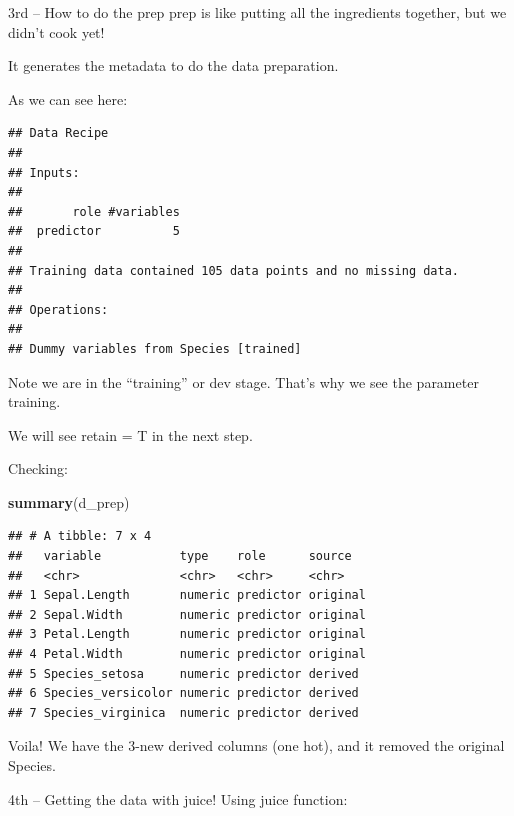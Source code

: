 \documentclass[]{article}
\newenvironment{Shaded}{\begin{snugshade}}{\end{snugshade}}
\newcommand{\KeywordTok}[1]{\textcolor[rgb]{0.13,0.29,0.53}{\textbf{#1}}}
\newcommand{\DataTypeTok}[1]{\textcolor[rgb]{0.13,0.29,0.53}{#1}}
\newcommand{\DecValTok}[1]{\textcolor[rgb]{0.00,0.00,0.81}{#1}}
\newcommand{\StringTok}[1]{\textcolor[rgb]{0.31,0.60,0.02}{#1}}
\newcommand{\OperatorTok}[1]{\textcolor[rgb]{0.81,0.36,0.00}{\textbf{#1}}}
\newcommand{\NormalTok}[1]{#1}
\begin{document}
3rd -- How to do the prep prep is like putting all the ingredients
together, but we didn't cook yet!

It generates the metadata to do the data preparation.

As we can see here:

\begin{Shaded}
\end{Shaded}

\begin{verbatim}
## Data Recipe
## 
## Inputs:
## 
##       role #variables
##  predictor          5
## 
## Training data contained 105 data points and no missing data.
## 
## Operations:
## 
## Dummy variables from Species [trained]
\end{verbatim}

Note we are in the ``training'' or dev stage. That's why we see the
parameter training.

We will see retain = T in the next step.

Checking:

\begin{Shaded}
\begin{Highlighting}[]
\KeywordTok{summary}\NormalTok{(d_prep)}
\end{Highlighting}
\end{Shaded}

\begin{verbatim}
## # A tibble: 7 x 4
##   variable           type    role      source  
##   <chr>              <chr>   <chr>     <chr>   
## 1 Sepal.Length       numeric predictor original
## 2 Sepal.Width        numeric predictor original
## 3 Petal.Length       numeric predictor original
## 4 Petal.Width        numeric predictor original
## 5 Species_setosa     numeric predictor derived 
## 6 Species_versicolor numeric predictor derived 
## 7 Species_virginica  numeric predictor derived
\end{verbatim}

Voila! We have the 3-new derived columns (one hot), and it removed the
original Species.

4th -- Getting the data with juice! Using juice function:
\end{document}

